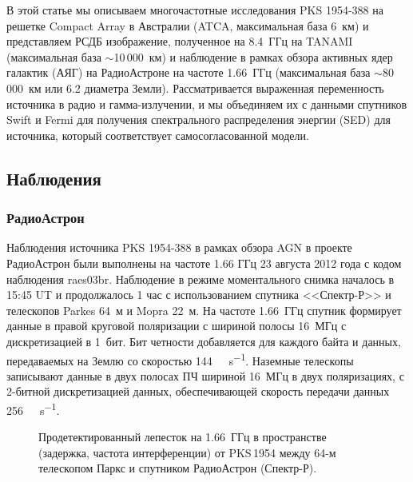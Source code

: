 В этой статье мы описываем многочастотные исследования PKS 1954-388 на решетке Compact Array в
Австралии (ATCA, максимальная база 6~км) и представляем РСДБ изображение, полученное на
8.4~ГГц на  TANAMI (максимальная база $\sim$10\,000~км) и наблюдение в рамках обзора активных ядер
галактик (АЯГ) на РадиоАстроне на частоте 1.66~ГГц (максимальная база $\sim$80\,000~км или 6.2
диаметра Земли). Рассматривается выраженная переменность источника в радио и гамма-излучении, и мы
объединяем их с данными спутников Swift и Fermi для получения спектрального распределения энергии
(SED) для источника, который соответствует самосогласованной модели.


\subsection{Наблюдения}

\subsubsection{РадиоАстрон}

Наблюдения источника PKS 1954-388 в рамках обзора AGN в проекте РадиоАстрон были выполнены на
частоте 1.66 ГГц 23 августа 2012 года с кодом наблюдения raes03br. Наблюдение в режиме
моментального снимка началось в 15:45 UT и продолжалось 1 час с использованием спутника
<<Спектр-Р>> и телескопов Parkes 64~м и Mopra 22~м. На частоте 1.66~ГГц спутник формирует данные
в правой круговой поляризации с шириной полосы 16~МГц с дискретизацией в 1~бит. Бит четности
добавляется для каждого байта и данных, передаваемых на Землю со скоростью
\SI{144}{\mega\bit\per\second}. Наземные телескопы записывают данные в двух полосах ПЧ шириной
16~МГц в двух поляризациях, с 2-битной дискретизацией данных, обеспечивающей скорость передачи
данных \SI{256}{\mega\bit\per\second}.

\begin{figure}[]
\caption{Продетектированный лепесток на 1.66~ГГц в пространстве (задержка, частота интерференции)
от PKS\,1954 между 64-м телескопом Паркс и спутником РадиоАстрон (Спектр-Р).}
\label{fig:pks_1954_fringe}
\end{figure}

